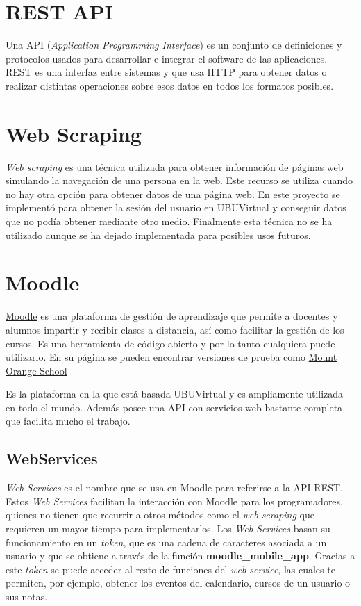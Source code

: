 
\section{REST API}

Una API \cite{QueEsAPI}(\textit{Application Programming Interface}) es un conjunto de definiciones y protocolos usados para desarrollar e integrar el software de las aplicaciones. REST \cite{APIRESTQue} es una interfaz entre sistemas y que usa HTTP para obtener datos o realizar distintas operaciones sobre esos datos en todos los formatos posibles.

\section{Web Scraping}

\textit{Web scraping} \cite{QueEsWeb2019} es una técnica utilizada para obtener información de páginas web simulando la navegación de una persona en la web. Este recurso se utiliza cuando no hay otra opción para obtener datos de una página web. En este proyecto se implementó para obtener la sesión del usuario en UBUVirtual y conseguir datos que no podía obtener mediante otro medio. Finalmente esta técnica no se ha utilizado aunque se ha dejado implementada para posibles usos futuros.

\section{Moodle}

\href{https://moodle.org/}{Moodle} \cite{Moodle2020} es una plataforma de gestión de aprendizaje que permite a docentes y alumnos impartir y recibir clases a distancia, así como facilitar la gestión de los cursos. Es una herramienta de código abierto y por lo tanto cualquiera puede utilizarlo. En su página se pueden encontrar versiones de prueba como \href{https://school.moodledemo.net/}{Mount Orange School}

Es la plataforma en la que está basada UBUVirtual y es ampliamente utilizada en todo el mundo. Además posee una API con servicios web bastante completa que facilita mucho el trabajo.

\subsection{WebServices}

\textit{Web Services} es el nombre que se usa en Moodle para referirse a la API REST. Estos \textit{Web Services} facilitan la interacción con Moodle para los programadores, quienes no tienen que recurrir a otros métodos como el \textit{web scraping} que requieren un mayor tiempo para implementarlos. Los \textit{Web Services} basan su funcionamiento en un \textit{token}, que es una cadena de caracteres asociada a un usuario y que se obtiene a través de la función \textbf{moodle\_mobile\_app}. Gracias a este \textit{token} se puede acceder al resto de funciones del \textit{web service}, las cuales te permiten, por ejemplo, obtener los eventos del calendario, cursos de un usuario o sus notas.

